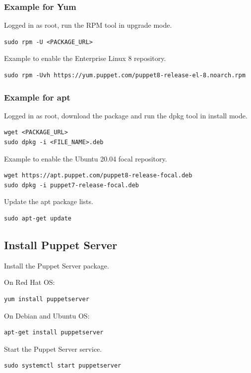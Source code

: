 \documentclass[12pt,a4paper,openright,twoside]{book}
\begin{document}
\subsubsection{Example for Yum}
Logged in as root, run the RPM tool in upgrade mode.
\begin{lstlisting}
sudo rpm -U <PACKAGE_URL>
\end{lstlisting}

Example to enable the Enterprise Linux 8 repository. 
\begin{lstlisting}
sudo rpm -Uvh https://yum.puppet.com/puppet8-release-el-8.noarch.rpm
\end{lstlisting}

\subsubsection{Example for apt}
Logged in as root, download the package and run the dpkg tool in install mode.
\begin{lstlisting}
wget <PACKAGE_URL>
sudo dpkg -i <FILE_NAME>.deb
\end{lstlisting}

Example to enable the Ubuntu 20.04 focal repository.
\begin{lstlisting}
wget https://apt.puppet.com/puppet8-release-focal.deb
sudo dpkg -i puppet7-release-focal.deb
\end{lstlisting}

Update the apt package lists.
\begin{lstlisting}
sudo apt-get update
\end{lstlisting}

\cite{puppetDocInstall}

\subsection{Install Puppet Server}
Install the Puppet Server package.


On Red Hat OS:
\begin{lstlisting}
yum install puppetserver
\end{lstlisting}

On Debian and Ubuntu OS:
\begin{lstlisting}
apt-get install puppetserver
\end{lstlisting}

Start the Puppet Server service.
\begin{lstlisting}
sudo systemctl start puppetserver
\end{lstlisting}
\end{document}
